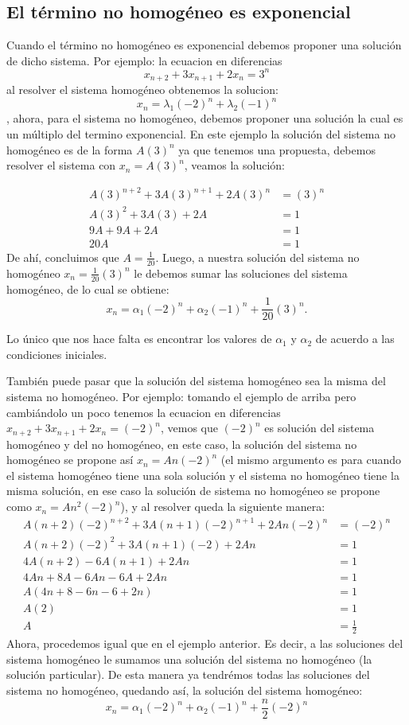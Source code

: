 \documentclass{report}
\begin{document}
\subsection{El término no homogéneo es exponencial}
\label{sec:exponencial}

Cuando el término no homogéneo es exponencial debemos proponer una
solución de dicho sistema. Por ejemplo: la ecuacion en diferencias
$$x_{n+2}+3x_{n+1}+2x_n=3^n$$ al resolver el sistema homogéneo
obtenemos la solucion:
$$x_n=\lambda_1(-2)^n+\lambda_2(-1)^n$$, ahora,
para el sistema no homogéneo, debemos proponer una solución la
cual es un múltiplo del termino exponencial. En este ejemplo la
solución del sistema no homogéneo es de la forma $A(3)^n$ ya que
tenemos una propuesta, debemos resolver el sistema con $x_n=A(3)^n$,
veamos la solución:

\begin{align*}
  A(3)^{n+2}+3A(3)^{n+1}+2A(3)^n&=(3)^n\\
  A(3)^2+3A(3)+2A&=1\\
  9A+9A+2A&=1\\
  20A&=1
\end{align*}
De ahí, concluimos que $A=\frac{1}{20}$.
Luego, a nuestra solución del sistema no homogéneo  $x_n=\frac{1}{20}(3)^n$ le debemos sumar las soluciones del sistema homogéneo, de lo cual se obtiene:
$$x_n=\alpha_1(-2)^n+\alpha_2(-1)^n+\frac{1}{20}(3)^n.$$

Lo único que nos hace falta es encontrar los valores de $\alpha_1$ y $\alpha_2$ de acuerdo a las condiciones iniciales.

También puede pasar que la solución del sistema homogéneo sea la misma del sistema no homogéneo. Por ejemplo: tomando el ejemplo de arriba pero cambiándolo un poco tenemos la ecuacion en diferencias $x_{n+2}+3x_{n+1}+2x_n=(-2)^n$, vemos que $(-2)^n$ es solución del sistema homogéneo y del no homogéneo, en este caso, la solución del sistema no homogéneo se propone así $x_n=An(-2)^n$ (el mismo argumento es para cuando el sistema homogéneo tiene una sola solución y el sistema no homogéneo tiene la misma solución, en ese caso la solución de sistema no homogéneo se propone como $x_n=An^2(-2)^n$), y al resolver queda la siguiente manera:
\begin{align*}
  A(n+2)(-2)^{n+2}+3A(n+1)(-2)^{n+1}+2An(-2)^n&=(-2)^n\\
  A(n+2)(-2)^2+3A(n+1)(-2)+2An&=1\\
  4A(n+2)-6A(n+1)+2An&=1\\
  4An+8A-6An-6A+2An&=1\\
  A(4n+8-6n-6+2n)&=1\\
  A(2)&=1\\
  A&=\frac{1}{2}
\end{align*}
Ahora, procedemos igual que en el ejemplo anterior. Es decir, a las soluciones del sistema homogéneo le sumamos una solución del sistema no homogéneo (la solución particular). De esta manera ya tendrémos todas las soluciones del sistema no homogéneo, quedando así, la solución del sistema homogéneo:
$$x_n=\alpha_1(-2)^n+\alpha_2(-1)^n+\frac{n}{2}(-2)^n$$
\end{document}
